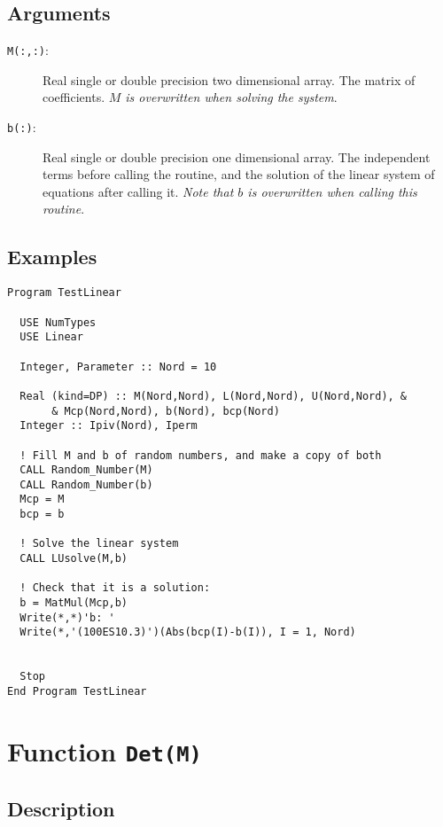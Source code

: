 \subsection{Arguments}

\begin{description}
\item[\texttt{M(:,:)}: ] Real single or double precision two
  dimensional array. The matrix of coefficients. \emph{$M$ is
    overwritten when solving the system}. 
\item[\texttt{b(:)}: ] Real single or double precision one dimensional
  array. The independent terms before calling the routine, and the
  solution of the linear system of equations after calling
  it. \emph{Note that $b$ is overwritten when calling this routine}.  
\end{description}

\subsection{Examples}

\begin{verbatim}
Program TestLinear

  USE NumTypes
  USE Linear

  Integer, Parameter :: Nord = 10

  Real (kind=DP) :: M(Nord,Nord), L(Nord,Nord), U(Nord,Nord), &
       & Mcp(Nord,Nord), b(Nord), bcp(Nord)
  Integer :: Ipiv(Nord), Iperm

  ! Fill M and b of random numbers, and make a copy of both
  CALL Random_Number(M)
  CALL Random_Number(b)
  Mcp = M
  bcp = b

  ! Solve the linear system
  CALL LUsolve(M,b)
  
  ! Check that it is a solution:
  b = MatMul(Mcp,b)
  Write(*,*)'b: '
  Write(*,'(100ES10.3)')(Abs(bcp(I)-b(I)), I = 1, Nord)


  Stop
End Program TestLinear
\end{verbatim}


\section{Function \texttt{Det(M)}}

\subsection{Description}

